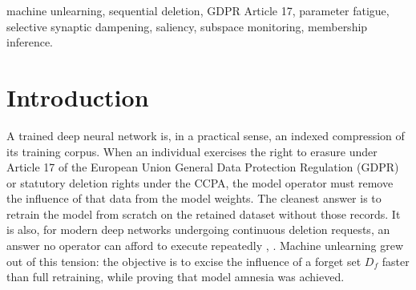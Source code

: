 \documentclass[conference]{IEEEtran}
\begin{document}
\begin{abstract}
Machine unlearning is predominantly evaluated under isolated, single-request assumptions: a model is trained, a single forget set is removed, and performance evaluation stops. Regulatory frameworks such as GDPR Article 17 and the California Consumer Privacy Act (CCPA) mandate continuous, sequential data erasure over the entire operational lifecycle of deployed systems. In this sequential regime, static unlearning heuristics (e.g., Selective Synaptic Dampening and Saliency Unlearning) suffer from severe parameter fatigue: repeated Fisher dampening indiscriminately degrades overlapping parameter dimensions, causing static SSD to catastrophically collapse to random guessing (9.96\% accuracy) by Round 3 under uniform random deletions. We present ASUC-SOM, an adaptive closed-loop controller that treats a stream of deletion requests as a geometric control problem. A Subspace Overlap Monitor (SOM) tracks an orthonormal basis $Q_k$ of historical gradient modification vectors, measuring projection overlap before weights are touched. An entropy-aware tiered router dynamically dispatches requests between rapid dampening (SSD, $\approx 150\times$ speedup), regularized saliency masking (SalUn, $\approx 115\times$ speedup), and selective exact retraining. A closed-loop verification gate enforces empirical forget and retain bounds with automated rollback and tier escalation. Evaluated on ResNet-18 across 20 sequential deletion rounds on CIFAR-10 (10,000 forgotten samples), ASUC-SOM maintains 97.19\% retain accuracy and 90.89\% generalization without experiencing rank collapse, delivering up to 148$\times$ compute speedup over full retraining.
\end{abstract}

\begin{IEEEkeywords}
machine unlearning, sequential deletion, GDPR Article 17, parameter fatigue, selective synaptic dampening, saliency, subspace monitoring, membership inference.
\end{IEEEkeywords}

\section{Introduction}
A trained deep neural network is, in a practical sense, an indexed compression of its training corpus. When an individual exercises the right to erasure under Article 17 of the European Union General Data Protection Regulation (GDPR) \cite{b1} or statutory deletion rights under the CCPA, the model operator must remove the influence of that data from the model weights. The cleanest answer is to retrain the model from scratch on the retained dataset without those records. It is also, for modern deep networks undergoing continuous deletion requests, an answer no operator can afford to execute repeatedly \cite{b2}, \cite{b3}. Machine unlearning grew out of this tension: the objective is to excise the influence of a forget set $D_f$ faster than full retraining, while proving that model amnesia was achieved.
\end{document}
